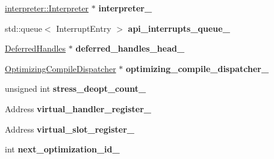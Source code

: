 \begin{DoxyCompactItemize}
\item 
\hyperlink{classv8_1_1internal_1_1interpreter_1_1_interpreter}{interpreter\+::\+Interpreter} $\ast$ {\bfseries interpreter\+\_\+}\hypertarget{classv8_1_1internal_1_1_isolate_ab403cfbd9f2807de57e2ff3407179951}{}\label{classv8_1_1internal_1_1_isolate_ab403cfbd9f2807de57e2ff3407179951}

\item 
std\+::queue$<$ Interrupt\+Entry $>$ {\bfseries api\+\_\+interrupts\+\_\+queue\+\_\+}\hypertarget{classv8_1_1internal_1_1_isolate_a0bea38e0f01f82bb5f5510c17ce5e7e2}{}\label{classv8_1_1internal_1_1_isolate_a0bea38e0f01f82bb5f5510c17ce5e7e2}

\item 
\hyperlink{classv8_1_1internal_1_1_deferred_handles}{Deferred\+Handles} $\ast$ {\bfseries deferred\+\_\+handles\+\_\+head\+\_\+}\hypertarget{classv8_1_1internal_1_1_isolate_a2b72dd69dc67aa0fbce2b3591ce2700b}{}\label{classv8_1_1internal_1_1_isolate_a2b72dd69dc67aa0fbce2b3591ce2700b}

\item 
\hyperlink{classv8_1_1internal_1_1_optimizing_compile_dispatcher}{Optimizing\+Compile\+Dispatcher} $\ast$ {\bfseries optimizing\+\_\+compile\+\_\+dispatcher\+\_\+}\hypertarget{classv8_1_1internal_1_1_isolate_a92624bf689dc87a8b85d6aa7c284c60c}{}\label{classv8_1_1internal_1_1_isolate_a92624bf689dc87a8b85d6aa7c284c60c}

\item 
unsigned int {\bfseries stress\+\_\+deopt\+\_\+count\+\_\+}\hypertarget{classv8_1_1internal_1_1_isolate_ac42e37aa8e17afa2ecb7fde694023433}{}\label{classv8_1_1internal_1_1_isolate_ac42e37aa8e17afa2ecb7fde694023433}

\item 
Address {\bfseries virtual\+\_\+handler\+\_\+register\+\_\+}\hypertarget{classv8_1_1internal_1_1_isolate_aebee8e1045d9b21b91d436d4de15f65a}{}\label{classv8_1_1internal_1_1_isolate_aebee8e1045d9b21b91d436d4de15f65a}

\item 
Address {\bfseries virtual\+\_\+slot\+\_\+register\+\_\+}\hypertarget{classv8_1_1internal_1_1_isolate_a07f5e31f29c5ffcaf8cc85f6daa0cbc3}{}\label{classv8_1_1internal_1_1_isolate_a07f5e31f29c5ffcaf8cc85f6daa0cbc3}

\item 
int {\bfseries next\+\_\+optimization\+\_\+id\+\_\+}\hypertarget{classv8_1_1internal_1_1_isolate_a0563dbcaa3919d6dade7b6af17efe164}{}\label{classv8_1_1internal_1_1_isolate_a0563dbcaa3919d6dade7b6af17efe164}


\end{DoxyCompactItemize}

